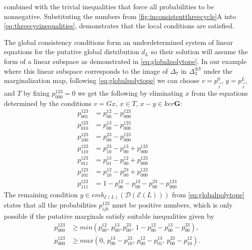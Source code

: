 combined with the trivial inequalities that force all probabilities to be nonnegative. Substituting the numbers from \ref{fig:inconsistentthreecycle}A into \ref{eq:threecycinequalities}, demonstrates that the local conditions are satisfied.

The global consistency conditions form an underdetermined system of linear equations for the putative global distribution $d_{L}$ so their solution will assume the form of a linear subspace as demonstrated in \ref{eq:globalpolytope}.  In our example where this linear subspace corresponds to the image of $\Delta_7$ in $\Delta_3^{\oplus 3}$ under the marginalization map, following \ref{eq:globalpolytope} we can choose $v=p^0_{\vec{i}}$, $y=p^L_{\vec{i}}$, and $T$ by fixing $p^{123}_{000}=0$ we get the following by eliminating $x$ from the equations determined by the conditions $v=Gx$, $x \in T$, $x-y \in ker \mathbf{G}$:
\begin{equation}
\begin{aligned}\label{eq:globalpositivityeqs}
p^{123}_{001} &= p^{12}_{00} - p^{123}_{000} \\
p^{123}_{010} &= p^{13}_{00} - p^{123}_{000} \\
p^{123}_{100} &= p^{23}_{00} - p^{123}_{000} \\
p^{123}_{110} &= p^{23}_{10} - p^{13}_{00} + p^{123}_{000} \\
p^{123}_{011} &= p^{13}_{01} - p^{12}_{00} + p^{123}_{000} \\
p^{123}_{101} &= p^{12}_{10} - p^{23}_{00} + p^{123}_{000} \\
p^{123}_{111} &= 1 - p^{12}_{00} - p^{13}_{00} - p^{23}_{00} - p^{123}_{000}
\end{aligned}
\end{equation}
The remaining condition $y \in emb_{\mathcal{E}(L)}(\mathcal{D}(\mathcal{E}(L)))$ from \ref{eq:globalpolytope} states that all the probabilities $p^{123}_{ijk}$ must be positive numbers, which is only possible if the putative marginals satisfy suitable inequalities given by
\begin{equation}
\begin{aligned}\label{eq:globalpositivityineqs}
p^{123}_{000} &\geq min(p^{12}_{00},\, p^{13}_{00},p^{23}_{00},\, 1 - p^{12}_{00} - p^{13}_{00} - p^{23}_{00}),\\
 p^{123}_{000} &\geq max(0,\, p^{13}_{00}-p^{23}_{10},\, p^{12}_{00}-p^{13}_{01},\, p^{23}_{00}-p^{12}_{10}).
\end{aligned}
\end{equation}
